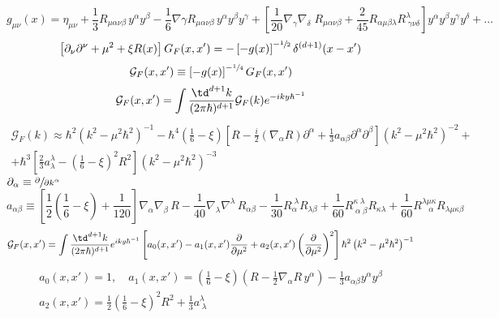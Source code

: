\cite{DeWitt}
\begin{equation}
	g_{\mu\nu}(x)=\eta_{\mu\nu}+\frac{1}{3}R_{\mu\alpha\nu\beta}\,y^\alpha y^\beta-\frac{1}{6}\nabla\gamma R_{\mu\alpha\nu\beta}\,y^\alpha y^\beta y^\gamma+\left[\frac{1}{20}\nabla_\gamma\nabla_\delta\; R_{\mu\alpha\nu\beta}+\frac{2}{45}R_{\alpha\mu\beta\lambda}R^\lambda_{\;\gamma\nu\delta}\right]y^\alpha y^\beta y^\gamma y^\delta+\hdots
\end{equation}
\begin{equation}
	\left[\partial_\nu\partial^\nu+\mu^2+\xi R(x)\right]G_F(x,x')=-\left[-g(x)\right]^{-\sfrac{1}{2}}\delta^{(d+1)}(x-x')
\end{equation}
\begin{equation}
	\mathcal{G}_F(x,x')\equiv \left[-g(x)\right]^{-\sfrac{1}{4}}G_F(x,x')
\end{equation}
\begin{equation}
	\mathcal{G}_F(x,x')=\int \frac{\td^{d+1}k}{(2\pi\hbar)^{d+1}}\mathcal{G}_F(k)e^{-iky\hbar^{-1}}
\end{equation}
\begin{multline}
	\mathcal{G}_F(k)\approx\hbar^2\left(k^2-\mu^2\hbar^2\right)^{-1}-\hbar^4\left(\frac{1}{6}-\xi\right)\left[R-\frac{i}{2}\left(\nabla_\alpha R\right)\partial^\alpha+\frac{1}{3}a_{\alpha\beta}\partial^\alpha\partial^\beta\right]\left(k^2-\mu^2\hbar^2\right)^{-2}+\\
	+\hbar^3\left[\frac{2}{3}a^\lambda_\lambda-\left(\frac{1}{6}-\xi\right)^2R^2\right]\left(k^2-\mu^2\hbar^2\right)^{-3}
\end{multline}
$\partial_\alpha\equiv\sfrac{\partial }{\partial k^\alpha}$
\begin{equation}
	a_{\alpha\beta}\equiv \left[\frac{1}{2}\left(\frac{1}{6}-\xi\right)+\frac{1}{120}\right]\nabla_\alpha\nabla_\beta\, R-\frac{1}{40}\nabla_\lambda\nabla^\lambda\,R_{\alpha\beta}-\frac{1}{30}R^{\;\lambda}_\alpha R_{\lambda\beta}+\frac{1}{60}R^{\kappa\;\lambda}_{\;\alpha\;\beta}R_{\kappa\lambda}+\frac{1}{60}R^{\lambda\mu\kappa}_{\;\;\;\alpha}R_{\lambda\mu\kappa\beta}
\end{equation}
\begin{equation}
	\mathcal{G}_F(x,x')=\int \frac{\td^{d+1}k}{(2\pi\hbar)^{d+1}}e^{iky\hbar^{-1}}\left[a_0(x,x')-a_1(x,x')\frac{\partial}{\partial \mu^2}+a_2(x,x')\left(\frac{\partial}{\partial \mu^2}\right)^2\right]\hbar^2\left(k^2-\mu^2\hbar^2\right)^{-1}
\end{equation}
\begin{subequations}
	\begin{gather}
		a_0(x,x')=1,\quad a_1(x,x')=\left(\frac{1}{6}-\xi\right)\left(R-\frac{1}{2}\nabla_\alpha R\,y^\alpha\right)-\frac{1}{3}a_{\alpha\beta} y^\alpha y^\beta\tag{\theequation \,\,a,b}\\
		a_2(x,x')=\frac{1}{2}\left(\frac{1}{6}-\xi\right)^2R^2+\frac{1}{3}a^\lambda_{\;\lambda}\tag{\theequation \,\,c}
	\end{gather}
\end{subequations}
